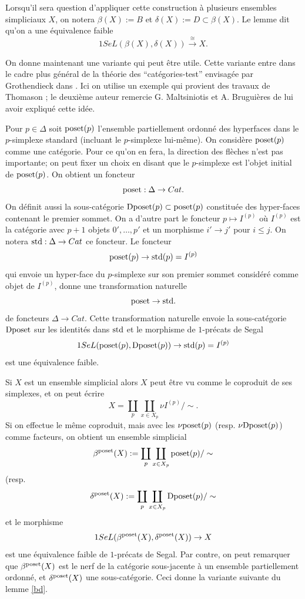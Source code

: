 \documentclass[12pt]{article}
\begin{document}
Lorsqu'il sera question d'appliquer cette construction \`a plusieurs ensembles
simpliciaux $X$, on notera $\beta (X):= B$ et $\delta (X):= D\subset \beta (X)$.
Le lemme dit qu'on a une \'equivalence faible
$$
1SeL(\beta (X), \delta (X))\stackrel{\cong}{\rightarrow} X.
$$

On donne maintenant une variante qui peut \^etre utile.  Cette
variante entre dans le cadre
plus g\'en\'eral de la th\'eorie des ``cat\'egories-test'' envisag\'ee par
Grothendieck dans \cite{Grothendieck}. Ici on  utilise un exemple qui provient
des travaux de Thomason \cite{ThomasonLimits} \cite{ThomasonCatMod}; le
deuxi\`eme auteur remercie G. Maltsiniotis et A. Brugui\`eres de lui avoir
expliqu\'e cette id\'ee.


Pour $p\in \Delta$ soit ${\rm poset}(p)$
l'ensemble partiellement ordonn\'e des hyperfaces dans le $p$-simplexe standard
(incluant le $p$-simplexe lui-m\^eme). On consid\`ere ${\rm poset}(p)$ comme une
cat\'egorie. Pour ce qu'on en fera, la direction des fl\`eches n'est pas
importante; on peut fixer un choix en disant que le $p$-simplexe est l'objet
initial de  ${\rm poset}(p)$. On obtient un foncteur
$$
{\rm poset}: \Delta \rightarrow Cat.
$$
On d\'efinit aussi la sous-cat\'egorie ${\rm Dposet} (p)\subset
{\rm poset}(p)$ constitu\'ee des hyper-faces contenant le premier sommet. On a
d'autre part le foncteur $p\mapsto I^{(p)}$ o\`u $I^{(p)}$ est la cat\'egorie
avec $p+1$ objets $0',\ldots , p'$ et un morphisme $i'\rightarrow j'$ pour
$i\leq j$. On notera ${\rm std}: \Delta \rightarrow Cat$ ce foncteur.
Le foncteur
$$
{\rm poset}(p)\rightarrow {\rm std}(p)= I^{(p)}
$$
qui envoie
un hyper-face du $p$-simplexe sur son premier sommet consid\'er\'e
comme objet de $I^{(p)}$, donne une transformation naturelle
$$
{\rm poset} \rightarrow {\rm std}.
$$
de foncteurs $\Delta
\rightarrow Cat$.
Cette transformation naturelle envoie la sous-cat\'egorie $ {\rm Dposet}$
sur les identit\'es dans ${\rm std}$ et le morphisme de $1$-pr\'ecats de Segal
$$
1SeL({\rm poset}(p), {\rm Dposet}(p) )\rightarrow {\rm std}(p)=I^{(p)}
$$
est une \'equivalence faible.

Si $X$ est un ensemble simplicial alors $X$ peut \^etre vu comme le coproduit
de ses simplexes, et on peut \'ecrire
$$
X= \coprod _p\coprod _{x\in X_p}\nu I^{(p)} /\sim .
$$
Si on effectue le m\^eme coproduit, mais avec les $\nu {\rm poset}(p)$
(resp. $\nu {\rm Dposet}(p)$) comme
facteurs, on obtient un ensemble simplicial
$$
\beta ^{\rm poset} (X):= \coprod _p \coprod _{x\in X_p}{\rm poset}(p) /\sim
$$
(resp.
$$
\delta ^{\rm poset} (X):= \coprod _p \coprod _{x\in X_p} {\rm Dposet}(p)
/\sim
$$
et le morphisme
$$
1SeL(\beta ^{\rm poset} (X), \delta ^{\rm poset} (X))\rightarrow
X
$$
est une \'equivalence faible de $1$-pr\'ecats de Segal. Par contre, on peut
remarquer que $\beta ^{\rm poset} (X)$ est le nerf de la cat\'egorie
sous-jacente \`a un ensemble partiellement ordonn\'e, et
$\delta ^{\rm poset} (X)$ une sous-cat\'egorie. Ceci donne la variante suivante
du lemme \ref{bd}.
\end{document}
